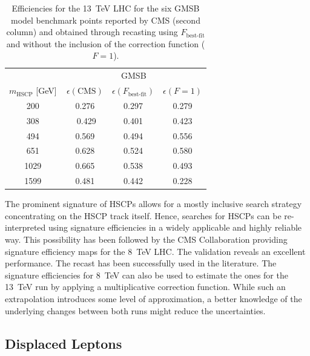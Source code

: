 \begin{table}[t]
\footnotesize
\begin{center}
\begin{tabular}{c|ccc}
 & \multicolumn{3}{c}{ GMSB } \\
$m_\text{HSCP}$ [{\rm GeV}] & \,$\epsilon(\text{CMS})$ & $\epsilon(F_\text{best-fit})$& $\epsilon(F=1)$ \\
\hline
200     &\,0.276   & 0.297  & 0.279 \\
308   & \, 0.429 &  0.401 & 0.423  \\
494    & \,0.569 & 0.494 & 0.556  \\
651  &  \,0.628 & 0.524 & 0.580 \\
1029 &\,0.665  & 0.538  & 0.493\\
1599 &  \,0.481  & 0.442  & 0.228 \\
\hline
\end{tabular}
\end{center}
\caption{Efficiencies for the 13~TeV LHC for the six GMSB model benchmark
points reported by CMS (second column)
and obtained through recasting using $F_\text{best-fit}$ and without the inclusion of the correction function ($F=1$).}
\label{tab:effGMSB}
\end{table}

\vskip 0.1in
\vskip 0.1in
The prominent signature of HSCPs allows for a mostly inclusive search strategy concentrating
on the HSCP track itself. Hence, searches for HSCPs can be re-interpreted using signature
efficiencies in a widely applicable and highly reliable way. This possibility has been followed
by the CMS Collaboration providing signature
efficiency maps for the 8~TeV LHC. The validation reveals an excellent performance. The
recast has been successfully used in the literature.
The signature efficiencies for 8~TeV can also be used to estimate the ones for the 13~TeV run by applying
a multiplicative correction function. While such an extrapolation introduces some level of approximation,
a better knowledge of the underlying changes between both runs might reduce the uncertainties.


\subsection{Displaced Leptons}
\label{sec:ch5-displacedLeptons}

